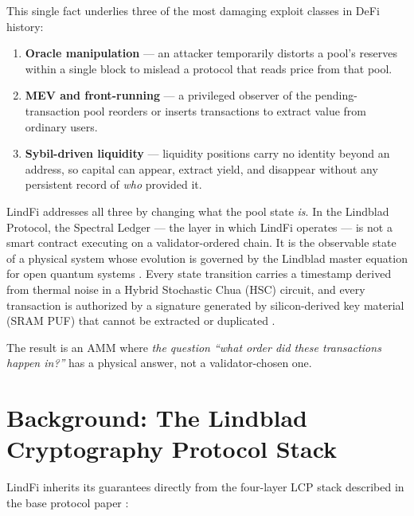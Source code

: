\documentclass[11pt,a4paper]{article}
\begin{document}
This single fact underlies three of the most damaging exploit classes in DeFi history:

\begin{enumerate}
    \item \textbf{Oracle manipulation} --- an attacker temporarily distorts a pool's reserves within a single block to mislead a protocol that reads price from that pool.
    \item \textbf{MEV and front-running} --- a privileged observer of the pending-transaction pool reorders or inserts transactions to extract value from ordinary users.
    \item \textbf{Sybil-driven liquidity} --- liquidity positions carry no identity beyond an address, so capital can appear, extract yield, and disappear without any persistent record of \emph{who} provided it.
\end{enumerate}

LindFi addresses all three by changing what the pool state \emph{is}. In the Lindblad Protocol, the Spectral Ledger --- the layer in which LindFi operates --- is not a smart contract executing on a validator-ordered chain. It is the observable state of a physical system whose evolution is governed by the Lindblad master equation for open quantum systems \cite{lindblad1976}. Every state transition carries a timestamp derived from thermal noise in a Hybrid Stochastic Chua (HSC) circuit, and every transaction is authorized by a signature generated by silicon-derived key material (SRAM PUF) that cannot be extracted or duplicated \cite{pappu2002}.

The result is an AMM where \emph{the question ``what order did these transactions happen in?''} has a physical answer, not a validator-chosen one.

\section{Background: The Lindblad Cryptography Protocol Stack}

LindFi inherits its guarantees directly from the four-layer LCP stack described in the base protocol paper \cite{lindblad_paper}:
\end{document}
